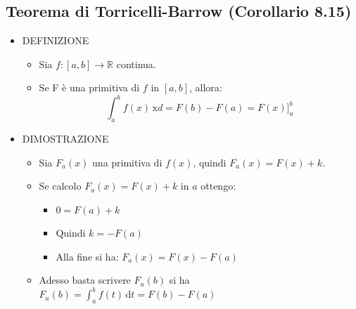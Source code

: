 \documentclass[10pt]{article}
\begin{document}
\begin{itemize}
\subsection{Teorema di Torricelli-Barrow (Corollario 8.15)}
\begin{itemize}
\item
DEFINIZIONE
\begin{itemize}
\item
Sia $ f: [a,b] \rightarrow \mathbb{R}$ continua. 
\item
Se F è una primitiva di $f$ in $ [a,b] $, allora:
$$\int_a^b \! f(x) \, \mathrm{x}d= F(b) - F(a) = F(x)]^b_a$$
\end{itemize}
\item
DIMOSTRAZIONE
\begin{itemize}
\item
Sia $F_a(x)$ una primitiva di $f(x)$, quindi $F_a(x) = F(x) + k$.
\item
Se calcolo $\displaystyle{F_a(x) = F(x) + k}$ in $a$ ottengo:
\begin{itemize}
\item
$ 0 = F(a) + k$
\item
Quindi $k = -F(a)$
\item
Alla fine si ha: $\displaystyle{F_a(x) = F(x) -F(a)}$
\end{itemize}
\item
Adesso basta scrivere $F_a(b)$ si ha $\displaystyle{F_a(b) = \int_a^b \! f(t) \, \mathrm{d}t = F(b) - F(a)}$
\end{itemize}
\end{itemize}
\end{itemize}
\end{document}
